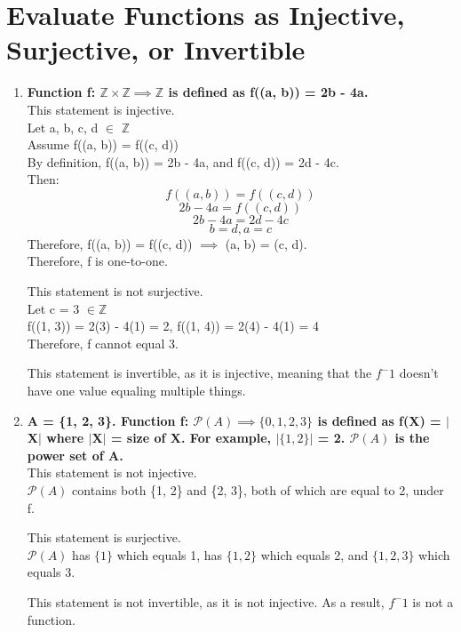 \documentclass[a4paper]{article}
\begin{document}
\bigskip %

\section{Evaluate Functions as Injective, Surjective, or Invertible}
\begin{enumerate}
    \item \boldmath \textbf{Function f: $\mathbb{Z} \times \mathbb{Z} \implies \mathbb{Z}$ is defined as f((a, b)) = 2b - 4a.} \unboldmath \\
    This statement is injective. \\
    Let a, b, c, d $\in$ $\mathbb{Z}$ \\
    Assume f((a, b)) = f((c, d)) \\
    By definition, f((a, b)) = 2b - 4a, and f((c, d)) = 2d - 4c. \\
    Then: \[ f((a, b)) = f((c, d)) \]
    \[2b - 4a = f((c, d)) \]
    \[2b - 4a = 2d - 4c\]
    \[b = d, a = c\]
    Therefore, f((a, b)) = f((c, d)) $\implies$ (a, b) = (c, d).\\
    Therefore, f is one-to-one.
    
    This statement is not surjective. \\
    Let c = 3 $\in \mathbb{Z}$\\
    f((1, 3)) = 2(3) - 4(1) = 2, f((1, 4)) = 2(4) - 4(1) = 4 \\
    Therefore, f cannot equal 3.
    
    This statement is invertible, as it is injective, meaning that the $f^-1$ doesn't have one value equaling multiple things.
    
    
    \item \boldmath \textbf{A = \{1, 2, 3\}. Function f: $\mathcal{P}(A) \implies \{0, 1, 2, 3\}$ is defined as f(X) = $|$X$|$ where $|$X$|$ = size of X. For example, $|\{1, 2\}|$ = 2. $\mathcal{P}(A)$ is the power set of A.} \unboldmath \\
    This statement is not injective. \\
    $\mathcal {P}(A)$ contains both \{1, 2\} and \{2, 3\}, both of which are equal to 2, under f.
    
    This statement is surjective.\\
    $\mathcal{P}(A)$ has $\{1\}$ which equals 1, has $\{1, 2\}$ which equals 2, and $\{1, 2, 3\}$ which equals 3.
    
    This statement is not invertible, as it is not injective. As a result, $f^-1$ is not a function.
    

\end{enumerate}
\end{document}
